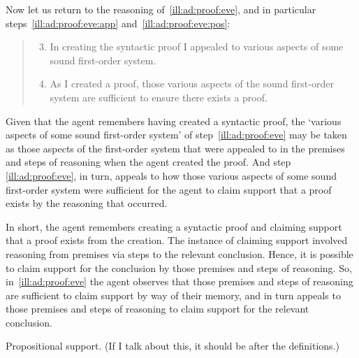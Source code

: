 \begin{note}
  Now let us return to the reasoning of~\autoref{ill:ad:proof:eve}, and in particular steps~\ref{ill:ad:proof:eve:app} and~\ref{ill:ad:proof:eve:pos}:
  \begin{quote}
    \begin{enumerate}
      \setcounter{enumi}{2}
    \item In creating the syntactic proof I appealed to various aspects of some sound first-order system.
    \item As I created a proof, those various aspects of the sound first-order system are sufficient to ensure there exists a proof.
    \end{enumerate}
  \end{quote}
  Given that the agent remembers having created a syntactic proof, the `various aspects of some sound first-order system' of step~\ref{ill:ad:proof:eve} may be taken as those aspects of the first-order system that were appealed to in the premises and steps of reasoning when the agent created the proof.
  And step \ref{ill:ad:proof:eve}, in turn, appeals to how those various aspects of some sound first-order system were sufficient for the agent to claim support that a proof exists by the reasoning that occurred.

  In short, the agent remembers creating a syntactic proof and claiming support that a proof exists from the creation.
  The instance of claiming support involved reasoning from premises via steps to the relevant conclusion.
  Hence, it is possible to claim support for the conclusion by those premises and steps of reasoning.
  So, in~\ref{ill:ad:proof:eve} the agent observes that those premises and steps of reasoning are sufficient to claim support by way of their memory, and in turn appeals to those premises and steps of reasoning to claim support for the relevant conclusion.
\end{note}

\begin{note}
  {
    \color{red}
    Propositional support.
    (If I talk about this, it should be after the definitions.)
  }
\end{note}

